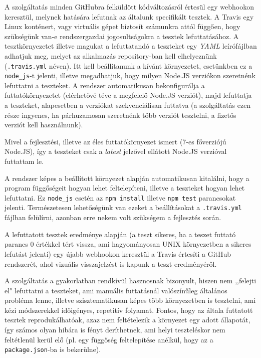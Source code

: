 A szolgáltatás minden GitHubra felküldött kódváltozásról értesül egy webhookon
keresztül, melynek hatására lefutnak az általunk specifikált tesztek.  A Travis
egy Linux konténert, vagy virtuális gépet biztosít számunkra attól függően, hogy
szükségünk van-e rendszergazdai jogosultságokra a tesztek lefuttatásához.  A
tesztkörnyezetet illetve magukat a lefuttatandó a teszteket egy \emph{YAML}
leírófájlban adhatjuk meg, melyet az alkalmazás repository-ban kell elhelyeznünk
(\texttt{.travis.yml} néven). Itt kell beállítanunk a kívánt környezetet,
esetünkben ez a \texttt{node\_js}-t jelenti, illetve megadhatjuk, hogy milyen
Node.JS verziókon szeretnénk lefuttatni a teszteket.  A rendszer automatikusan
bekonfigurálja a futtatókörnyezetet (elérhetővé téve a megfelelő Node.JS
verziót), majd lefuttatja a teszteket, alapesetben a verziókat szekvenciálisan
futtatva (a szolgáltatás ezen része ingyenes, ha párhuzamosan szeretnénk több
verziót tesztelni, a fizetős verziót kell használnunk).

Mivel a fejlesztési, illetve az éles futtatókörnyezet ismert (7-es főverziójú
Node.JS), így a teszteket csak a \emph{latest} jelzővel ellátott Node.JS
verzióval futtattam le.

A rendszer képes a beállított környezet alapján automatikusan kitalálni, hogy a
program függőségeit hogyan lehet feltelepíteni, illetve a teszteket hogyan lehet
lefuttatni. Ez \texttt{node\_js} esetén az \texttt{npm install} illetve
\texttt{npm test} parancsokat jelenti. Természetesen lehetőségünk van ezeket a
beállításokat a \texttt{.travis.yml} fájlban felülírni, azonban erre nekem volt
szükségem a fejlesztés során.

A lefuttatott tesztek eredménye alapján (a teszt sikeres, ha a teszet futtató
parancs $0$ értékkel tért vissza, ami hagyományosan UNIX környezetben a sikeres
lefutást jelenti\cite{bash}) egy újabb webhookon keresztül a Travis értesíti a
GitHub rendszerét, ahol vizuális visszajelzést is kapunk a teszt eredményéről.

A szolgáltatás a gyakorlatban rendkívül hasznosnak bizonyult, hiszen nem
,,felejti el" lefuttatni a teszteket, ami manuális futtatásnál valószínűleg
általános probléma lenne, illetve szisztematikusan képes több környezetben is
tesztelni, ami kézi módszerekkel időigényes, repetitív folyamat. Fontos, hogy az
általa futtatott tesztek reprodukálhatóak, azaz nem feltételezik a környezet egy
adott állapotát, így számos olyan hibára is fényt deríthetnek, ami helyi
teszteléskor nem feltétlenül kerül elő (pl. egy függőség feltelepítése anélkül,
hogy az a \texttt{package.json}-ba is bekerülne).


